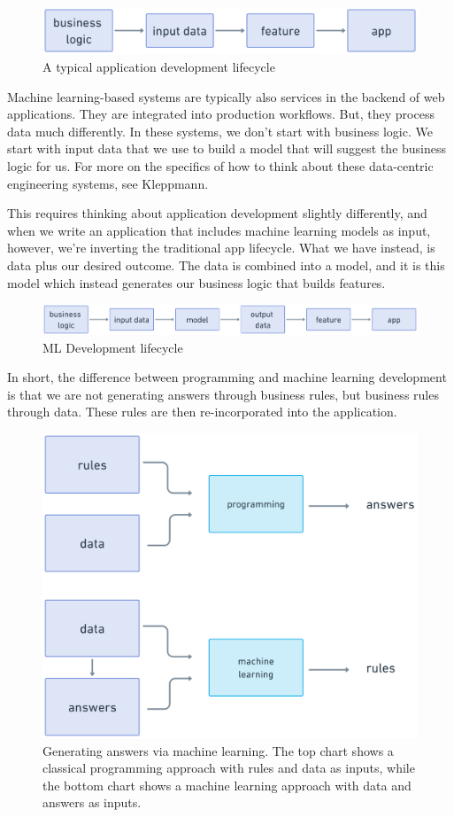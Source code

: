\documentclass[11pt, table]{diazessay} %
\begin{document}
\begin{sloppypar}
\begin{figure}[H]
\centering
\includegraphics[width=.75\textwidth]{figures/app_flow.png}
\caption{A typical application development lifecycle}
\end{figure}

Machine learning-based systems are typically also services in the backend of web applications. They are integrated into production workflows. But, they process data much differently. In these systems, we don't start with business logic. We start with input data that we use to build a model that will suggest the business logic for us. For more on the specifics of how to think about these data-centric engineering systems, see Kleppmann\cite{kleppmann2017designing}.

This requires thinking about application development slightly differently, and when we write an application that includes machine learning models as input, however, we’re inverting the traditional app lifecycle. What we have instead, is data plus our desired outcome. The data is combined into a model, and it is this model which instead generates our business logic that builds features.

\begin{figure}[H]
\centering
\includegraphics[width=.95\textwidth]{figures/ml-flow.png}
\caption{ML Development lifecycle}
\end{figure}

In short, the difference between programming and machine learning development is that we are not generating answers through business rules, but business rules through data. These rules are then re-incorporated into the application.

\begin{figure}[H]
\centering
\includegraphics[width=.75\textwidth]{figures/rules_ml.png}
\caption{Generating answers via machine learning. The top chart shows a classical programming approach with rules and data as inputs, while the bottom chart shows a machine learning approach with data and answers as inputs.  \citep{chollet2021deep}}
\end{figure}


\end{sloppypar}
\end{document}
